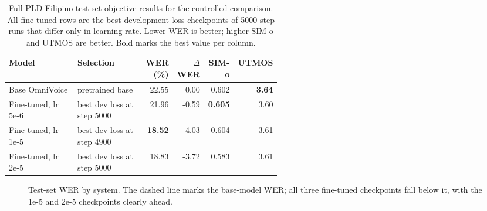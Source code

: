 \documentclass[11pt]{article}
\begin{document}
\begin{table}[H]
  \centering
  \caption{Full PLD Filipino test-set objective results for the controlled comparison. All fine-tuned rows are the best-development-loss checkpoints of 5000-step runs that differ only in learning rate. Lower WER is better; higher SIM-o and UTMOS are better. Bold marks the best value per column.}
  \scriptsize
  \setlength{\tabcolsep}{3pt}
  \begin{tabular}{p{0.27\linewidth}p{0.27\linewidth}rrrr}
    \toprule
    Model & Selection & WER (\%) & $\Delta$WER & SIM-o & UTMOS \\
    \midrule
    Base OmniVoice & pretrained base & 22.55 & 0.00 & 0.602 & \textbf{3.64} \\
    Fine-tuned, lr 5e-6 & best dev loss at step 5000 & 21.96 & -0.59 & \textbf{0.605} & 3.60 \\
    Fine-tuned, lr 1e-5 & best dev loss at step 4900 & \textbf{18.52} & -4.03 & 0.604 & 3.61 \\
    Fine-tuned, lr 2e-5 & best dev loss at step 5000 & 18.83 & -3.72 & 0.583 & 3.61 \\
    \bottomrule
  \end{tabular}
  \label{tab:objective-results}
\end{table}

\begin{figure}[H]
  \centering
  \caption{Test-set WER by system. The dashed line marks the base-model WER; all three fine-tuned checkpoints fall below it, with the 1e-5 and 2e-5 checkpoints clearly ahead.}
  \label{fig:wer-chart}
\end{figure}
\end{document}
